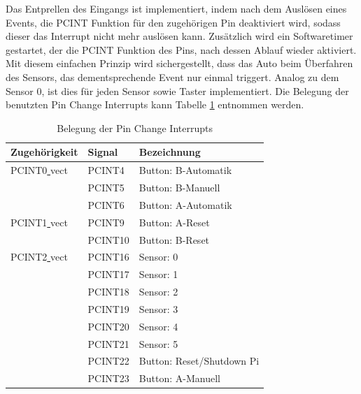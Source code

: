 \documentclass[a4paper, 11pt]{report}
\begin{document}
			Das Entprellen des Eingangs ist implementiert, indem nach dem Auslösen eines Events, die PCINT Funktion für den zugehörigen Pin deaktiviert wird, sodass dieser das Interrupt nicht mehr auslösen kann. Zusätzlich wird ein Softwaretimer gestartet, der die PCINT Funktion des Pins, nach dessen Ablauf wieder aktiviert. Mit diesem einfachen Prinzip wird sichergestellt, dass das Auto beim Überfahren des Sensors, das dementsprechende Event nur einmal triggert.
			Analog zu dem Sensor 0, ist dies für jeden Sensor sowie Taster implementiert. Die Belegung der benutzten Pin Change Interrupts kann Tabelle \ref{tab:belegungpcint} entnommen werden.
			\begin{table}[ht]
				\caption{Belegung der Pin Change Interrupts}
				\begin{tabular}{|l|l|l|}
					\hline
					Zugehörigkeit & Signal & Bezeichnung\\
					\hline
					\hline
					PCINT0\underline{ }vect & PCINT4 & Button: B-Automatik\\
					\hline
											& PCINT5 & Button: B-Manuell\\
					\hline
											& PCINT6 & Button: A-Automatik\\
					\hline
					\hline
					PCINT1\underline{ }vect & PCINT9 & Button: A-Reset\\
					\hline
											& PCINT10 & Button: B-Reset\\
					\hline
					\hline
					PCINT2\underline{ }vect & PCINT16 & Sensor: 0\\
					\hline
											& PCINT17 & Sensor: 1\\
					\hline
											& PCINT18 & Sensor: 2\\
					\hline
											& PCINT19 & Sensor: 3\\
					\hline
											& PCINT20 & Sensor: 4\\
					\hline
											& PCINT21 & Sensor: 5\\
					\hline
											& PCINT22 & Button: Reset/Shutdown Pi\\
					\hline
											& PCINT23 & Button: A-Manuell\\
					\hline
				\end{tabular}
				\label{tab:belegungpcint}
			\end{table}
\end{document}
